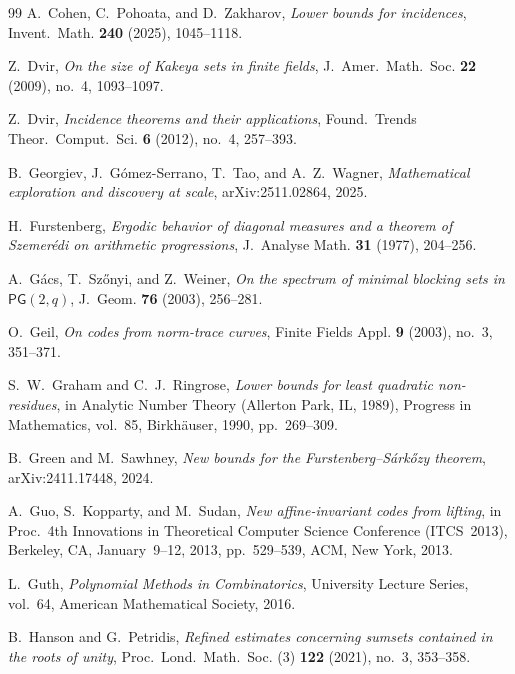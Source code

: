 \documentclass[12pt,reqno]{amsart}
\theoremstyle{plain}
\theoremstyle{definition}
\newcommand{\1}{\mathbf{1}}
\begin{document}
\begin{thebibliography}{99}
A.~Cohen, C.~Pohoata, and D.~Zakharov,
\newblock \emph{Lower bounds for incidences},
\newblock Invent.\ Math. \textbf{240} (2025), 1045--1118.

Z.~Dvir,
\newblock \emph{On the size of Kakeya sets in finite fields},
\newblock J.\ Amer.\ Math.\ Soc. \textbf{22} (2009), no.~4, 1093--1097.

Z.~Dvir,
\newblock \emph{Incidence theorems and their applications},
\newblock Found.\ Trends Theor.\ Comput.\ Sci. \textbf{6} (2012), no.~4, 257--393.

B.~Georgiev, J.~G\'omez-Serrano, T.~Tao, and A.~Z.~Wagner,
\newblock \emph{Mathematical exploration and discovery at scale},
\newblock arXiv:2511.02864, 2025.

H.~Furstenberg,
\newblock \emph{Ergodic behavior of diagonal measures and a theorem of Szemer\'edi on arithmetic progressions},
\newblock J.\ Analyse Math. \textbf{31} (1977), 204--256.

A.~G\'acs, T.~Sz\H{o}nyi, and Z.~Weiner,
\newblock \emph{On the spectrum of minimal blocking sets in $\mathsf{PG}(2,q)$},
\newblock J.\ Geom. \textbf{76} (2003), 256--281.

O.~Geil,
\newblock \emph{On codes from norm-trace curves},
\newblock Finite Fields Appl. \textbf{9} (2003), no.~3, 351--371.

S.~W.~Graham and C.~J.~Ringrose,
\newblock \emph{Lower bounds for least quadratic non-residues},
\newblock in Analytic Number Theory (Allerton Park, IL, 1989),
Progress in Mathematics, vol.~85, Birkh\"auser, 1990, pp.~269--309.

B.~Green and M.~Sawhney,
\newblock \emph{New bounds for the Furstenberg--S\'{a}rk\H{o}zy theorem},
\newblock arXiv:2411.17448, 2024.

A.~Guo, S.~Kopparty, and M.~Sudan,
\newblock \emph{New affine-invariant codes from lifting},
\newblock in Proc.\ 4th Innovations in Theoretical Computer Science Conference (ITCS~2013),
Berkeley, CA, January~9--12, 2013, pp.~529--539, ACM, New York, 2013.

L.~Guth,
\newblock \emph{Polynomial Methods in Combinatorics},
\newblock University Lecture Series, vol.~64, American Mathematical Society, 2016.

B.~Hanson and G.~Petridis,
\newblock \emph{Refined estimates concerning sumsets contained in the roots of unity},
\newblock Proc.\ Lond.\ Math.\ Soc. (3) \textbf{122} (2021), no.~3, 353--358.


\end{thebibliography}
\end{document}
